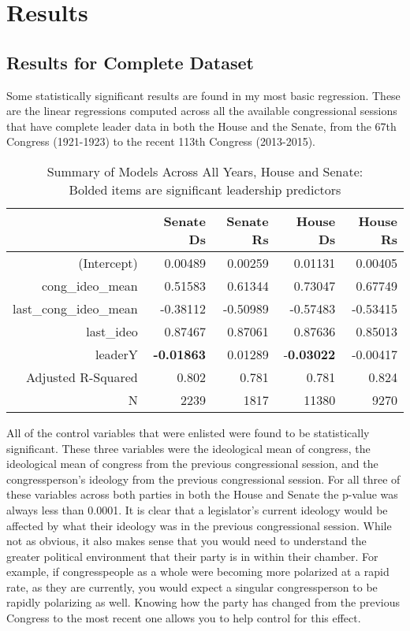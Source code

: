 \documentclass[12pt,twoside]{reedthesis}
\begin{document}
  \chapter{Results}\label{results}
  
  \section{Results for Complete
  Dataset}\label{results-for-complete-dataset}
  
  Some statistically significant results are found in my most basic
  regression. These are the linear regressions computed across all the
  available congressional sessions that have complete leader data in both
  the House and the Senate, from the 67th Congress (1921-1923) to the
  recent 113th Congress (2013-2015).
  
  \begin{table}[h]
  \centering
  \caption[Summary of Models Across All Years, House and Senate]{Summary of Models Across All Years, House and Senate: \\ Bolded items are significant leadership predictors}
  \begin{tabular}{r|rrrr}
                         & Senate Ds & Senate Rs & House Ds & House Rs \\ \hline
  (Intercept)            & 0.00489   & 0.00259   & 0.01131  & 0.00405  \\
  cong\_ideo\_mean       & 0.51583   & 0.61344   & 0.73047  & 0.67749  \\
  last\_cong\_ideo\_mean & -0.38112  & -0.50989  & -0.57483 & -0.53415 \\
  last\_ideo             & 0.87467   & 0.87061   & 0.87636  & 0.85013  \\
  leaderY                & \textbf{-0.01863}  & 0.01289   & -\textbf{0.03022} & -0.00417 \\
  Adjusted R-Squared     & 0.802     & 0.781     & 0.781    & 0.824    \\
  N                      & 2239      & 1817      & 11380    & 9270    
  \end{tabular}
  \end{table}
  
  All of the control variables that were enlisted were found to be
  statistically significant. These three variables were the ideological
  mean of congress, the ideological mean of congress from the previous
  congressional session, and the congressperson's ideology from the
  previous congressional session. For all three of these variables across
  both parties in both the House and Senate the p-value was always less
  than 0.0001. It is clear that a legislator's current ideology would be
  affected by what their ideology was in the previous congressional
  session. While not as obvious, it also makes sense that you would need
  to understand the greater political environment that their party is in
  within their chamber. For example, if congresspeople as a whole were
  becoming more polarized at a rapid rate, as they are currently, you
  would expect a singular congressperson to be rapidly polarizing as well.
  Knowing how the party has changed from the previous Congress to the most
  recent one allows you to help control for this effect.
  
\end{document}
